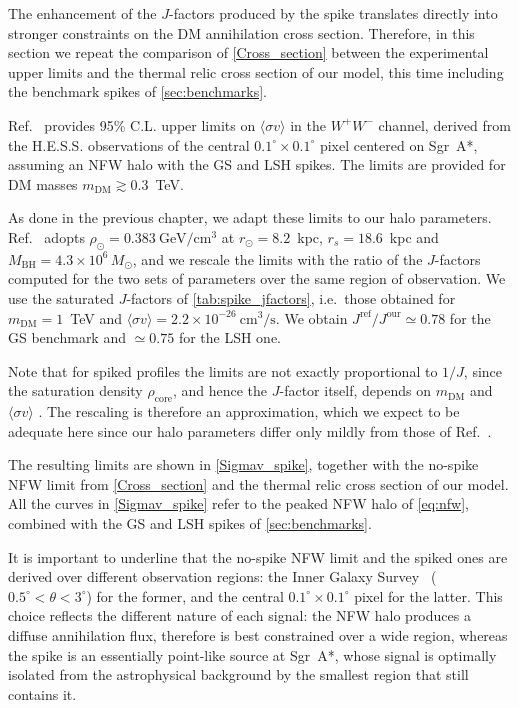 The enhancement of the $J$-factors produced by the spike translates directly into
stronger constraints on the DM annihilation cross section. 
Therefore, in this section we repeat the comparison of \cref{Cross_section} between the experimental
upper limits and the thermal relic cross section of our model, this time
including the benchmark spikes of \cref{sec:benchmarks}.

Ref.~\cite{balaji2023darkmatterspikessgr} provides 95\% C.L. upper limits on
$\langle\sigma v\rangle$ in the $W^{+}W^{-}$ channel, derived from the H.E.S.S.
observations \cite{HESS_PeVatron_2016} of the central $0.1^\circ\times 0.1^\circ$ pixel centered on Sgr~A*, assuming an
NFW halo with the GS and LSH spikes. The limits are provided for DM masses
$m_{\mathrm{DM}} \gtrsim 0.3$~TeV.

As done in the previous chapter, we adapt these limits to our halo parameters.
Ref.~\cite{balaji2023darkmatterspikessgr} adopts
$\rho_\odot = 0.383~\mathrm{GeV/cm^3}$ at $r_\odot = 8.2$~kpc, $r_s = 18.6$~kpc
and $M_{\mathrm{BH}} = 4.3\times 10^{6}\,M_\odot$, and we rescale the limits
with the ratio of the $J$-factors computed for the two sets of parameters over
the same region of observation. We use the saturated $J$-factors of
\cref{tab:spike_jfactors}, i.e.\ those obtained for $m_{\mathrm{DM}} = 1$~TeV and
$\langle\sigma v\rangle = 2.2\times 10^{-26}~\mathrm{cm^3/s}$. We obtain
$J^{\mathrm{ref}}/J^{\mathrm{our}} \simeq 0.78$ for the GS benchmark and
$\simeq 0.75$ for the LSH one.

Note that for spiked profiles the limits are not exactly proportional to
$1/J$, since the saturation density $\rho_{\mathrm{core}}$, and hence the
$J$-factor itself, depends on $m_{\mathrm{DM}}$ and $\langle\sigma v
\rangle$ \cite{balaji2023darkmatterspikessgr}. 
The rescaling is therefore an approximation, which we expect to be adequate here since our
halo parameters differ only mildly from those of
Ref.~\cite{balaji2023darkmatterspikessgr}.


The resulting limits are shown in \cref{Sigmav_spike}, together with the
no-spike NFW limit from \cref{Cross_section} and the
thermal relic cross section of our model.
All the curves in \cref{Sigmav_spike} refer to the peaked NFW halo of
\cref{eq:nfw}, combined with the GS and LSH spikes of \cref{sec:benchmarks}.


It is important to underline that the no-spike NFW limit and the spiked ones
are derived over different observation regions: the Inner Galaxy Survey~\cite{Abdalla_2022}
($0.5^\circ < \theta < 3^\circ$) for the former, and the central
$0.1^\circ\times 0.1^\circ$ pixel for the latter.
This choice reflects the different nature of each signal: the NFW halo produces a diffuse annihilation flux, therefore is best 
constrained over a wide region, whereas the spike is an essentially
point-like source at Sgr~A*, whose signal is optimally isolated from the
astrophysical background by the smallest region that still contains it.


